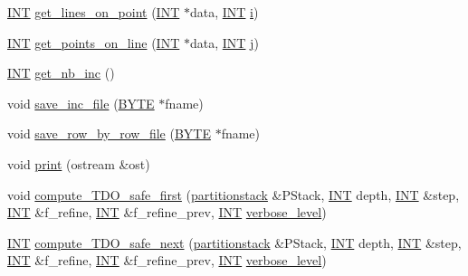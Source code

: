 \begin{DoxyCompactItemize}
\mbox{\hyperlink{galois_8h_a09fddde158a3a20bd2dcadb609de11dc}{I\+NT}} \mbox{\hyperlink{classincidence__structure_a09148fd9478525b4a65c8e44833d1861}{get\+\_\+lines\+\_\+on\+\_\+point}} (\mbox{\hyperlink{galois_8h_a09fddde158a3a20bd2dcadb609de11dc}{I\+NT}} $\ast$data, \mbox{\hyperlink{galois_8h_a09fddde158a3a20bd2dcadb609de11dc}{I\+NT}} \mbox{\hyperlink{alphabet2_8_c_acb559820d9ca11295b4500f179ef6392}{i}})
\item 
\mbox{\hyperlink{galois_8h_a09fddde158a3a20bd2dcadb609de11dc}{I\+NT}} \mbox{\hyperlink{classincidence__structure_a1baf0d372125123bf55d27dacc720bda}{get\+\_\+points\+\_\+on\+\_\+line}} (\mbox{\hyperlink{galois_8h_a09fddde158a3a20bd2dcadb609de11dc}{I\+NT}} $\ast$data, \mbox{\hyperlink{galois_8h_a09fddde158a3a20bd2dcadb609de11dc}{I\+NT}} \mbox{\hyperlink{alphabet2_8_c_a37d972ae0b47b9099e30983131d31916}{j}})
\item 
\mbox{\hyperlink{galois_8h_a09fddde158a3a20bd2dcadb609de11dc}{I\+NT}} \mbox{\hyperlink{classincidence__structure_acdc1d5ce64ece8aefa6bcc7656ed932c}{get\+\_\+nb\+\_\+inc}} ()
\item 
void \mbox{\hyperlink{classincidence__structure_a4fd15671d6a99a4cae34a24e3c0b7705}{save\+\_\+inc\+\_\+file}} (\mbox{\hyperlink{galois_8h_ab6cc7b4aeb6ea31aba2b3fbfc83ff5e6}{B\+Y\+TE}} $\ast$fname)
\item 
void \mbox{\hyperlink{classincidence__structure_a611541f0a070bbd664b0ff99da79a72f}{save\+\_\+row\+\_\+by\+\_\+row\+\_\+file}} (\mbox{\hyperlink{galois_8h_ab6cc7b4aeb6ea31aba2b3fbfc83ff5e6}{B\+Y\+TE}} $\ast$fname)
\item 
void \mbox{\hyperlink{classincidence__structure_a3f2a71302ef03e37de0654794e2a2c1a}{print}} (ostream \&ost)
\item 
void \mbox{\hyperlink{classincidence__structure_aa84c3d810b1b3cfa8395ccdac1392017}{compute\+\_\+\+T\+D\+O\+\_\+safe\+\_\+first}} (\mbox{\hyperlink{classpartitionstack}{partitionstack}} \&P\+Stack, \mbox{\hyperlink{galois_8h_a09fddde158a3a20bd2dcadb609de11dc}{I\+NT}} depth, \mbox{\hyperlink{galois_8h_a09fddde158a3a20bd2dcadb609de11dc}{I\+NT}} \&step, \mbox{\hyperlink{galois_8h_a09fddde158a3a20bd2dcadb609de11dc}{I\+NT}} \&f\+\_\+refine, \mbox{\hyperlink{galois_8h_a09fddde158a3a20bd2dcadb609de11dc}{I\+NT}} \&f\+\_\+refine\+\_\+prev, \mbox{\hyperlink{galois_8h_a09fddde158a3a20bd2dcadb609de11dc}{I\+NT}} \mbox{\hyperlink{simeon_8_c_a818073fbcc2f439e7c56952f67386122}{verbose\+\_\+level}})
\item 
\mbox{\hyperlink{galois_8h_a09fddde158a3a20bd2dcadb609de11dc}{I\+NT}} \mbox{\hyperlink{classincidence__structure_a7c315a348fc6bed0f8642767cc9cd7d1}{compute\+\_\+\+T\+D\+O\+\_\+safe\+\_\+next}} (\mbox{\hyperlink{classpartitionstack}{partitionstack}} \&P\+Stack, \mbox{\hyperlink{galois_8h_a09fddde158a3a20bd2dcadb609de11dc}{I\+NT}} depth, \mbox{\hyperlink{galois_8h_a09fddde158a3a20bd2dcadb609de11dc}{I\+NT}} \&step, \mbox{\hyperlink{galois_8h_a09fddde158a3a20bd2dcadb609de11dc}{I\+NT}} \&f\+\_\+refine, \mbox{\hyperlink{galois_8h_a09fddde158a3a20bd2dcadb609de11dc}{I\+NT}} \&f\+\_\+refine\+\_\+prev, \mbox{\hyperlink{galois_8h_a09fddde158a3a20bd2dcadb609de11dc}{I\+NT}} \mbox{\hyperlink{simeon_8_c_a818073fbcc2f439e7c56952f67386122}{verbose\+\_\+level}})

\end{DoxyCompactItemize}

